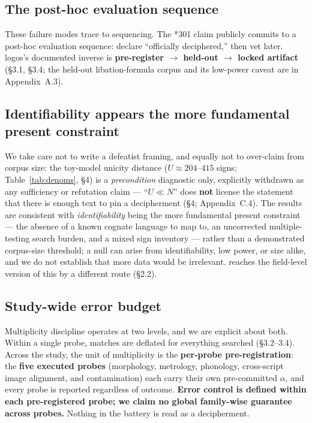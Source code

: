 \subsection{The post-hoc evaluation sequence}

These failure modes trace to sequencing. The *301 claim publicly commits to
a post-hoc evaluation sequence: declare ``officially deciphered,'' then vet
later. logos's documented inverse is \textbf{pre-register $\rightarrow$
held-out $\rightarrow$ locked artifact} (\S3.1, \S3.4; the held-out
libation-formula corpus and its low-power caveat are in Appendix~A.3).

\subsection{Identifiability appears the more fundamental present constraint}

We take care not to write a defeatist framing, and equally not to
over-claim from corpus size: the toy-model unicity distance
($U \approx 204$--$415$ signs; Table~\ref{tab:denoms}, \S4) is a
\emph{precondition} diagnostic
only, explicitly withdrawn as any sufficiency or refutation claim ---
``$U \ll N$'' does \textbf{not} license the statement that there is enough
text to pin a decipherment (\S4; Appendix~C.4). The
results are consistent with \emph{identifiability} being the more
fundamental present constraint --- the absence of a known cognate language
to map to, an uncorrected multiple-testing search burden, and a mixed sign
inventory --- rather than a demonstrated corpus-size threshold; a null can
arise from identifiability, low power, or size alike, and we do not
establish that more data would be irrelevant.
\citet[\S8]{salgarella2025}
reaches the field-level version of this by a different route (\S2.2).

\subsection{Study-wide error budget}

Multiplicity discipline operates at two levels, and we are explicit about
both. Within a single probe, matches are deflated for everything
searched (\S3.2--3.4). Across the study, the unit of multiplicity is the
\textbf{per-probe pre-registration}: the \textbf{five executed probes}
(morphology, metrology, phonology, cross-script image alignment, and
contamination) each carry their own pre-committed $\alpha$, and every probe
is reported regardless of outcome. \textbf{Error control is defined within
each pre-registered probe; we claim no global family-wise guarantee across
probes.} Nothing in the battery is read as a decipherment.

